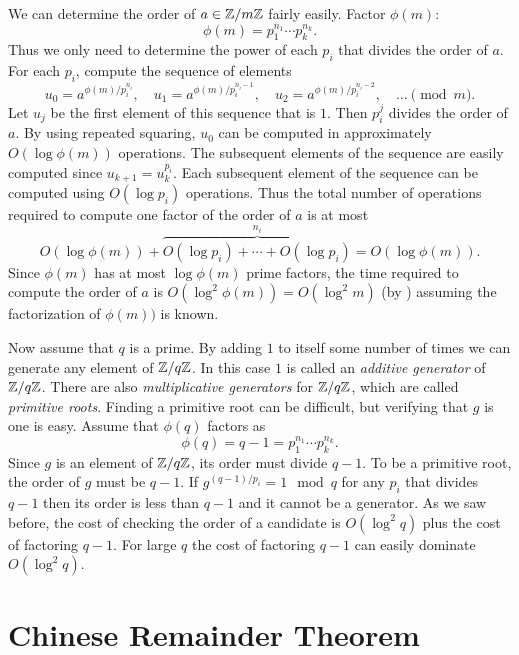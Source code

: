 We can determine the order of $a \in \mathbb{Z}/m\mathbb{Z}$ fairly easily.  Factor
$\phi(m)$:
\[
\phi(m) = p_1^{n_1} \cdots p_k^{n_k}.
\]
Thus we only need to determine the power of each $p_i$ that divides
the order of $a$.  For each $p_i$, compute the sequence of elements
\[
u_0 = a^{\phi(m)/p_i^{n_i}},\quad u_1 = a^{\phi(m)/p_i^{n_i-1}},\quad 
  u_2 = a^{\phi(m)/p_i^{n_i-2}},\quad \ldots \pmod{m}. 
\]
Let $u_j$ be the first element of this sequence that is $1$.  Then
$p_i^j$ divides the order of $a$.  By using repeated squaring, $u_0$
can be computed in approximately $O(\log \phi(m))$ operations.  The 
subsequent elements of the sequence are easily computed since $u_{k+1}
= u_k^{p_i}$.  Each subsequent element of the sequence can be computed
using $O(\log p_i)$ operations.  Thus the total number of operations
required to compute one factor of the order of $a$ is at most
\[
O(\log \phi(m)) + \overbrace{O(\log p_i) + \cdots + O(\log p_i)}^{n_i}
  = O(\log \phi(m)).
\]
Since $\phi(m)$ has at most $\log \phi(m)$ prime factors, the time
required to compute the order of $a$ is $O(\log^2 \phi(m)) = O(\log^2
m)$ (by ) assuming the factorization
of $\phi(m))$ is known.

Now assume that $q$ is a prime.  By adding $1$ to itself some number
of times we can generate any element of $\mathbb{Z}/q\mathbb{Z}$.  In this case $1$ is
called an {\em additive generator} of
$\mathbb{Z}/q\mathbb{Z}$.  There are also {\em multiplicative generators}
 for $\mathbb{Z}/q\mathbb{Z}$, which are  called {\em
primitive roots\/}. Finding a primitive root
can be difficult, but verifying that $g$ is one is easy.  Assume that
$\phi(q)$ factors as
\[
\phi(q) = q - 1 = p_1^{n_1} \cdots p_k^{n_k}.
\]
Since $g$ is an element of $\mathbb{Z}/q\mathbb{Z}$, its order must divide $q-1$.  To
be a primitive root, the order of $g$ must be $q-1$.  If
$g^{(q-1)/p_i} = 1 \mod{q}$ for any $p_i$ that divides $q-1$ then its
order is less than $q-1$ and it cannot be a generator.  As we saw
before, the cost of checking the order of a candidate is $O(\log^2 q)$
plus the cost of factoring $q-1$.  For large $q$ the cost of factoring
$q-1$ can easily dominate $O(\log^2 q)$.

\section{Chinese Remainder Theorem}
\label{Integer:Chinese:Remainder:Sec}


